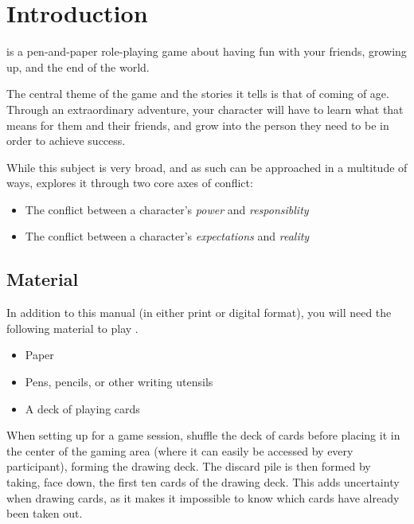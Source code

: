 \chapter{Introduction}

\ParadoxSpaceRPG{} is a pen-and-paper role-playing game about having fun with your friends, growing up,
and the end of the world.

The central theme of the game and the stories it tells is that of coming of age. Through an extraordinary
adventure, your character will have to learn what that means for them and their friends, and grow into the
person they need to be in order to achieve success.

While this subject is very broad, and as such can be approached in a multitude of ways, \ParadoxSpaceRPG{}
explores it through two core axes of conflict:
\begin{itemize}
	\item The conflict between a character's \emph{power} and \emph{responsiblity}
	\item The conflict between a character's \emph{expectations} and \emph{reality}
\end{itemize}


\section{Material}

In addition to this manual (in either print or digital format), you will need the following material to play
\ParadoxSpaceRPG.

\begin{itemize}
\item Paper
\item Pens, pencils, or other writing utensils
\item A deck of playing cards
\end{itemize}

When setting up for a game session, shuffle the deck of cards before placing it in the center of the gaming area
(where it can easily be accessed by every participant), forming the drawing deck. The discard pile is then formed
by taking, face down, the first ten cards of the drawing deck. This adds uncertainty when drawing cards, as it
makes it impossible to know which cards have already been taken out.

